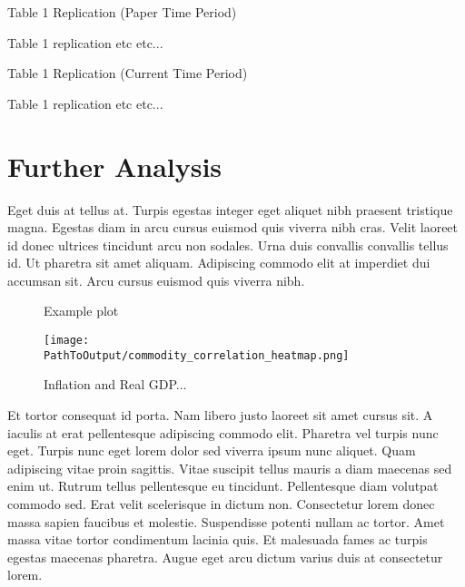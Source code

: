 \documentclass[12pt]{article}
\begin{document}
\begin{table}[ht!]
    \caption{Table 1 Replication (Paper Time Period)}
    \centering
    \begin{adjustbox}{max width=\textwidth}
    
    \end{adjustbox}
    \caption*{
      Table 1 replication etc etc...
    }
    \label{table:paper_table1_replication_paper}
\end{table}

\begin{table}[ht!]
  \caption{Table 1 Replication (Current Time Period)}
  \centering
  \begin{adjustbox}{max width=\textwidth}
  
  \end{adjustbox}
  \caption*{
    Table 1 replication etc etc...
  }
  \label{table:paper_table1_replication_current}
\end{table}

\newpage
\section{Further Analysis}
Eget duis at tellus at. Turpis egestas integer eget aliquet nibh praesent
tristique magna. Egestas diam in arcu cursus euismod quis viverra nibh cras.
Velit laoreet id donec ultrices tincidunt arcu non sodales. Urna duis
convallis convallis tellus id. Ut pharetra sit amet aliquam. Adipiscing
commodo elit at imperdiet dui accumsan sit. Arcu cursus euismod quis viverra
nibh. 



\begin{figure}[ht!]
\centering
\caption{Example plot}
  \centering
  \texttt{[image: \\PathToOutput/commodity\_correlation\_heatmap.png]}
\caption*{
  Inflation and Real GDP...
  }
\label{fig:commodity_correlation_heatmap}
\end{figure}


Et tortor consequat id porta. Nam libero justo laoreet sit amet cursus sit. A
iaculis at erat pellentesque adipiscing commodo elit. Pharetra vel turpis
nunc eget. Turpis nunc eget lorem dolor sed viverra ipsum nunc aliquet. Quam
adipiscing vitae proin sagittis. Vitae suscipit tellus mauris a diam maecenas
sed enim ut. Rutrum tellus pellentesque eu tincidunt. Pellentesque diam
volutpat commodo sed. Erat velit scelerisque in dictum non. Consectetur lorem
donec massa sapien faucibus et molestie. Suspendisse potenti nullam ac
tortor. Amet massa vitae tortor condimentum lacinia quis. Et malesuada fames
ac turpis egestas maecenas pharetra. Augue eget arcu dictum varius duis at
consectetur lorem.




\end{document}
